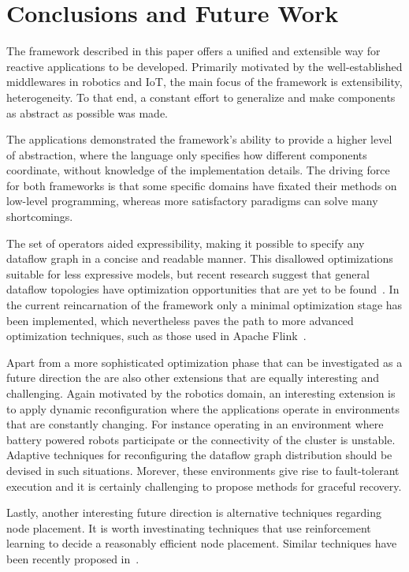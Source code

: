 \documentclass[sigplan,screen,review,anonymous]{acmart}
\begin{document}
\section{Conclusions and Future Work} \label{sec:conclusions}

The framework described in this paper offers a unified and extensible way for
reactive applications to be developed. Primarily motivated by the well-established
middlewares in robotics and IoT, the main focus of the framework is extensibility,
heterogeneity. To that end, a constant effort to generalize and make components
as abstract as possible was made.

The applications demonstrated the framework's ability to provide a higher level
of abstraction, where the language only specifies how different components
coordinate, without knowledge of the implementation details. The driving force
for both frameworks is that some specific domains have fixated their methods
on low-level programming, whereas more satisfactory paradigms can solve many
shortcomings.

The set of operators aided expressibility, making it possible to specify any
dataflow graph in a concise and readable manner. This disallowed optimizations
suitable for less expressive models, but recent research suggest that general
dataflow topologies have optimization opportunities that are yet to be
found~\cite{blackbox}. In the current reincarnation of the framework only
a minimal optimization stage has been implemented, which nevertheless paves
the path to more advanced optimization techniques, such as those used in
Apache Flink~\cite{blackbox}.

Apart from a more sophisticated optimization phase that can be investigated
as a future direction the are also other extensions that are equally interesting
and challenging. Again motivated by the robotics domain, an interesting extension
is to apply dynamic reconfiguration where the applications operate in
environments that are constantly changing. For instance operating in an environment
where battery powered robots participate or the connectivity of the cluster is unstable.
Adaptive techniques for reconfiguring the dataflow graph distribution should be
devised in such situations. Morever, these environments give rise to fault-tolerant
execution and it is certainly challenging to propose methods for graceful recovery.

Lastly, another interesting future direction is alternative techniques regarding
node placement. It is worth investinating techniques that use reinforcement learning
to decide a reasonably efficient node placement. Similar techniques have been
recently proposed in~\cite{DBLP:conf/icml/MirhoseiniPLSLZ17}.



\end{document}
